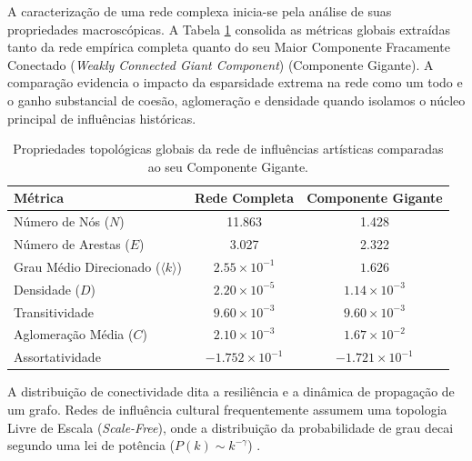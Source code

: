 \documentclass[12pt,a4paper]{article}
\begin{document}
A caracterização de uma rede complexa inicia-se pela análise de suas propriedades macroscópicas. A Tabela \ref{tab:propriedades_globais} consolida as métricas globais extraídas tanto da rede empírica completa quanto do seu Maior Componente Fracamente Conectado (\textit{Weakly Connected Giant Component}) (Componente Gigante). A comparação evidencia o impacto da esparsidade extrema na rede como um todo e o ganho substancial de coesão, aglomeração e densidade quando isolamos o núcleo principal de influências históricas.

\begin{table}[htpb]
    \centering
    \caption{Propriedades topológicas globais da rede de influências artísticas comparadas ao seu Componente Gigante.}
    \label{tab:propriedades_globais}
    \begin{tabular}{@{}lcc@{}}
        \toprule
        \textbf{Métrica}                             & \textbf{Rede Completa}  & \textbf{Componente Gigante} \\ \midrule
        Número de Nós ($N$)                          & 11.863                  & 1.428                       \\
        Número de Arestas ($E$)                      & 3.027                   & 2.322                       \\
        Grau Médio Direcionado ($\langle k \rangle$) & $2.55 \times 10^{-1}$   & $1.626$                     \\
        Densidade ($D$)                              & $2.20 \times 10^{-5}$   & $1.14 \times 10^{-3}$       \\
        Transitividade                               & $9.60 \times 10^{-3}$   & $9.60 \times 10^{-3}$       \\
        Aglomeração Média ($C$)                      & $2.10 \times 10^{-3}$   & $1.67 \times 10^{-2}$       \\
        Assortatividade                              & $-1.752 \times 10^{-1}$ & $-1.721 \times 10^{-1}$     \\ \bottomrule
    \end{tabular}
\end{table}

A distribuição de conectividade dita a resiliência e a dinâmica de propagação de um grafo. Redes de influência cultural frequentemente assumem uma topologia Livre de Escala (\textit{Scale-Free}), onde a distribuição da probabilidade de grau decai segundo uma lei de potência ($P(k) \sim k^{-\gamma}$) \cite{barabasi_network_science, park2015}.
\end{document}
